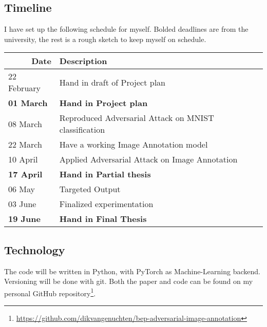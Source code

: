 \documentclass[12pt]{extarticle}
\begin{document}
\subsection{Timeline}
I have set up the following schedule for myself. Bolded deadlines are from the university, the rest is a rough sketch to keep myself on schedule.

\begin{table}[h]
    \begin{tabular}{|l|l|}
        \hline
        \multicolumn{1}{|r|}{Date} & Description                                           \\ \hline
        22 February                & Hand in draft of Project plan                         \\ \hline
        \textbf{01 March}          & \textbf{Hand in Project plan}                         \\ \hline
        08 March                   & Reproduced Adversarial Attack on MNIST classification \\ \hline
        22 March                   & Have a working Image Annotation model                 \\ \hline
        10 April                   & Applied Adversarial Attack on Image Annotation        \\ \hline
        \textbf{17 April}          & \textbf{Hand in Partial thesis}                       \\ \hline
        06 May                     & Targeted Output                                       \\ \hline
        03 June                    & Finalized experimentation                             \\ \hline
        \textbf{19 June}           & \textbf{Hand in Final Thesis}                         \\ \hline
    \end{tabular}
\end{table}


\subsection{Technology}
The code will be written in Python, with PyTorch as Machine-Learning backend.
Versioning will be done with git. Both the paper and code can be found on my personal GitHub repository\footnote{\url{https://github.com/dikvangenuchten/bep-adversarial-image-annotation}}.



\end{document}
